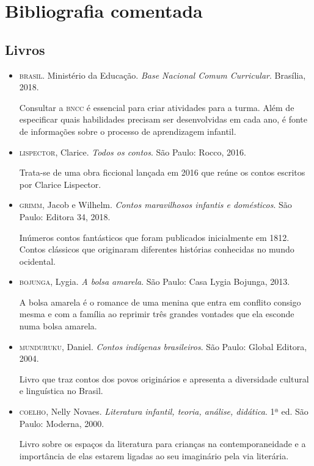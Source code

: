 \documentclass[11pt]{extarticle}
\begin{document}
\section{Bibliografia comentada}
\subsection{Livros}

\begin{itemize}
\item \textsc{brasil}. Ministério da Educação. \textit{Base Nacional Comum Curricular}. Brasília, 2018.

Consultar a \textsc{bncc} é essencial para criar atividades para a turma. Além de especificar quais habilidades precisam ser desenvolvidas em cada ano, é fonte de informações sobre o processo de aprendizagem infantil. 

\item \textsc{lispector}, Clarice. \textit{Todos os contos}. São Paulo: Rocco, 2016.

Trata-se de uma obra ficcional lançada em 2016 que reúne os contos escritos por Clarice Lispector. 
 
\item \textsc{grimm}, Jacob e Wilhelm. \textit{Contos maravilhosos infantis e domésticos}. São Paulo: Editora 34, 2018.

Inúmeros contos fantásticos que foram publicados inicialmente em 1812. Contos clássicos que originaram diferentes histórias conhecidas no mundo ocidental.

\item \textsc{bojunga}, Lygia. \textit{A bolsa amarela}. São Paulo: Casa Lygia Bojunga, 2013.

A bolsa amarela é o romance de uma menina que entra em conflito consigo mesma e com a família ao reprimir três grandes vontades que ela esconde numa bolsa amarela.

\item \textsc{munduruku}, Daniel. \textit{Contos indígenas brasileiros}. São Paulo: Global Editora, 2004.

Livro que traz contos dos povos originários e apresenta a diversidade cultural e linguística no Brasil.

\item \textsc{coelho}, Nelly Novaes. \textit{Literatura infantil, teoria, análise, didática}. 1ª ed. São Paulo: Moderna, 2000.

Livro sobre os espaços da literatura para crianças na contemporaneidade e a importância de elas estarem ligadas ao seu imaginário pela via literária.

\end{itemize}
\end{document}
